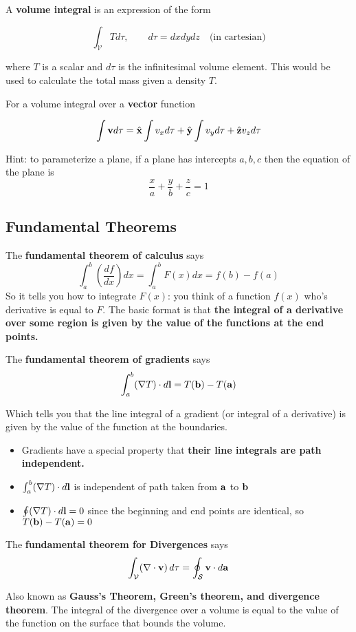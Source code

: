 \documentclass{article}
\newcommand{\vh}[1]{\hat{\vb{#1}}}
\begin{document}
A \textbf{volume integral} is an expression of the form

$$
\int_{\mathcal{V}} T d\tau, \qquad d\tau = dxdydz \quad \text{(in cartesian)}
$$

where $T$ is a scalar and $d\tau$ is the infinitesimal volume element.  This would be used to calculate the total mass given a density $T$.

For a volume integral over a \textbf{vector} function

$$
\int \vb{v} d\tau = \vh{x} \int v_x d\tau + \vh{y} \int v_y d\tau + \vh{z} v_z d\tau
$$

Hint: to parameterize a plane, if a plane has intercepts $a, b, c$ then the equation of the plane is
$$
\frac{x}{a} + \frac{y}{b} + \frac{z}{c} = 1
$$

\subsection{Fundamental Theorems}

The \textbf{fundamental theorem of calculus} says
$$
\int_a^b \left( \frac{df}{dx} \right) dx = \int_a^b F(x) dx = f(b) - f(a)
$$
So it tells you how to integrate $F(x)$: you think of a function $f(x)$ who's derivative is equal to $F$.  The basic format is that \textbf{the integral of a derivative over some region is given by the value of the functions at the end points.}

The \textbf{fundamental theorem of gradients} says 
$$
\int_a^b (\nabla T) \cdot d\vb{l} = T(\vb{b}) - T(\vb{a})
$$

Which tells you that the line integral of a gradient (or integral of a derivative) is given by the value of the function at the boundaries.
\begin{itemize}
    \item Gradients have a special property that \textbf{their line integrals are path independent.}
    \item $\int_a^b(\nabla T)\cdot d\vb{l}$ is independent of path taken from $\vb{a}$ to $\vb{b}$
    \item $\oint (\nabla T)\cdot d\vb{l} = 0$ since the beginning and end points are identical, so $T(\vb{b}) - T(\vb{a}) = 0$
\end{itemize}


The \textbf{fundamental theorem for Divergences} says
$$
\int_{\mathcal{V}} (\nabla \cdot \vb{v} )\, d\tau = \oint_{\mathcal{S}} \vb{v} \cdot d\vb{a}
$$

Also known as \textbf{Gauss's Theorem, Green's theorem, and divergence theorem}.  The integral of the divergence over a volume is equal to the value of the function on the surface that bounds the volume.
\end{document}
